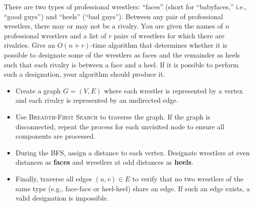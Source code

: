 \item[\textbf{Exercise 20.2-7}]
There are two types of professional wrestlers: ``faces'' (short for
``babyfaces,'' i.e., ``good guys'') and ``heels'' (``bad guys''). Between any
pair of professional wrestlers, there may or may not be a rivalry. You are given
the names of $n$ professional wrestlers and a list of $r$ pairs of wrestlers for
which there are rivalries. Give an $O(n + r)$-time algorithm that determines
whether it is possible to designate some of the wrestlers as faces and the
remainder as heels such that each rivalry is between a face and a heel. If it is
possible to perform such a designation, your algorithm should produce it.

\Solution

\begin{itemize}
    \item Create a graph $G = (V, E)$ where each wrestler is represented by a
    vertex and each rivalry is represented by an undirected edge.

    \item Use \textsc{Breadth-First Search} to traverse the graph. If the graph
    is disconnected, repeat the process for each unvisited node to ensure all
    components are processed.
    
    \item During the BFS, assign a distance to each vertex. Designate wrestlers
    at even distances as \textbf{faces} and wrestlers at odd distances as
    \textbf{heels}.
    
    \item Finally, traverse all edges $(u, v) \in E$ to verify that no two
    wrestlers of the same type (e.g., face-face or heel-heel) share an edge. If
    such an edge exists, a valid designation is impossible.
\end{itemize}
